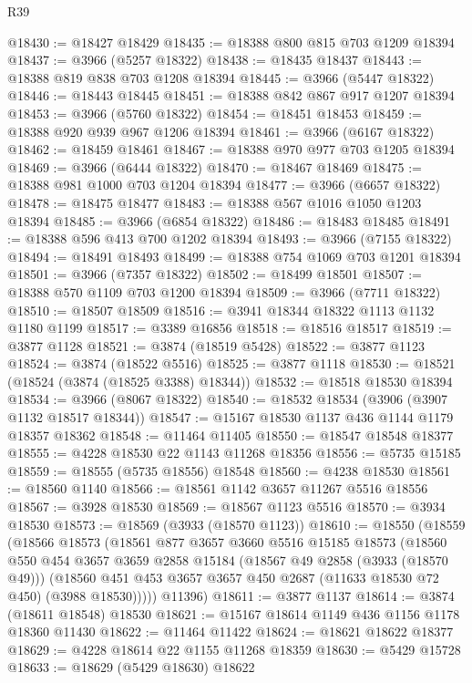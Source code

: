 \begin{lexlean}{R39}
\begin{coremodule}
@18430 := @18427 @18429
@18435 := @18388 @800 @815 @703 @1209 @18394
@18437 := @3966 (@5257 @18322)
@18438 := @18435 @18437
@18443 := @18388 @819 @838 @703 @1208 @18394
@18445 := @3966 (@5447 @18322)
@18446 := @18443 @18445
@18451 := @18388 @842 @867 @917 @1207 @18394
@18453 := @3966 (@5760 @18322)
@18454 := @18451 @18453
@18459 := @18388 @920 @939 @967 @1206 @18394
@18461 := @3966 (@6167 @18322)
@18462 := @18459 @18461
@18467 := @18388 @970 @977 @703 @1205 @18394
@18469 := @3966 (@6444 @18322)
@18470 := @18467 @18469
@18475 := @18388 @981 @1000 @703 @1204 @18394
@18477 := @3966 (@6657 @18322)
@18478 := @18475 @18477
@18483 := @18388 @567 @1016 @1050 @1203 @18394
@18485 := @3966 (@6854 @18322)
@18486 := @18483 @18485
@18491 := @18388 @596 @413 @700 @1202 @18394
@18493 := @3966 (@7155 @18322)
@18494 := @18491 @18493
@18499 := @18388 @754 @1069 @703 @1201 @18394
@18501 := @3966 (@7357 @18322)
@18502 := @18499 @18501
@18507 := @18388 @570 @1109 @703 @1200 @18394
@18509 := @3966 (@7711 @18322)
@18510 := @18507 @18509
@18516 := @3941 @18344 @18322 @1113 @1132 @1180 @1199
@18517 := @3389 @16856
@18518 := @18516 @18517
@18519 := @3877 @1128
@18521 := @3874 (@18519 @5428)
@18522 := @3877 @1123
@18524 := @3874 (@18522 @5516)
@18525 := @3877 @1118
@18530 := @18521 (@18524 (@3874 (@18525 @3388) @18344))
@18532 := @18518 @18530 @18394
@18534 := @3966 (@8067 @18322)
@18540 := @18532 @18534 (@3906 (@3907 @1132 @18517 @18344))
@18547 := @15167 @18530 @1137 @436 @1144 @1179 @18357 @18362
@18548 := @11464 @11405
@18550 := @18547 @18548 @18377
@18555 := @4228 @18530 @22 @1143 @11268 @18356
@18556 := @5735 @15185
@18559 := @18555 (@5735 @18556) @18548
@18560 := @4238 @18530
@18561 := @18560 @1140
@18566 := @18561 @1142 @3657 @11267 @5516 @18556
@18567 := @3928 @18530
@18569 := @18567 @1123 @5516
@18570 := @3934 @18530
@18573 := @18569 (@3933 (@18570 @1123))
@18610 := @18550
    (@18559
      (@18566
        @18573
        (@18561
          @877
          @3657
          @3660
          @5516
          @15185
          @18573
          (@18560
            @550
            @454
            @3657
            @3659
            @2858
            @15184
            (@18567 @49 @2858 (@3933 (@18570 @49)))
            (@18560 @451 @453 @3657 @3657 @450 @2687 (@11633 @18530 @72 @450) (@3988 @18530)))))
      @11396)
@18611 := @3877 @1137
@18614 := @3874 (@18611 @18548) @18530
@18621 := @15167 @18614 @1149 @436 @1156 @1178 @18360 @11430
@18622 := @11464 @11422
@18624 := @18621 @18622 @18377
@18629 := @4228 @18614 @22 @1155 @11268 @18359
@18630 := @5429 @15728
@18633 := @18629 (@5429 @18630) @18622

\end{coremodule}
\end{lexlean}
